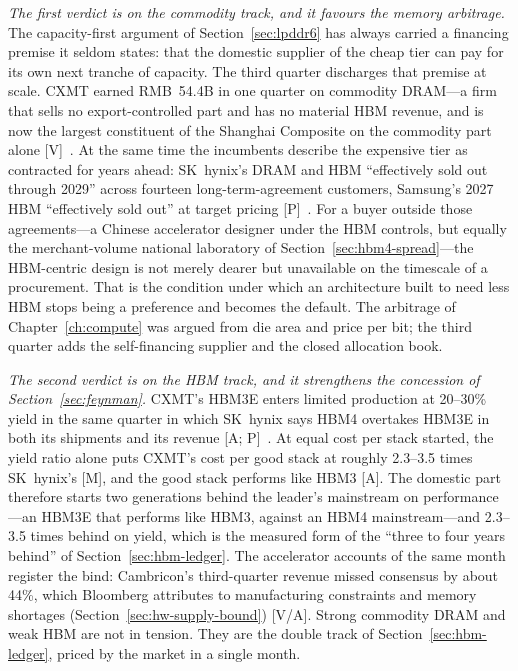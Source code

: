 \emph{The first verdict is on the commodity track, and it favours the memory arbitrage.} The capacity-first argument of Section~\ref{sec:lpddr6} has always carried a financing premise it seldom states: that the domestic supplier of the cheap tier can pay for its own next tranche of capacity. The third quarter discharges that premise at scale. CXMT earned RMB~54.4B in one quarter on commodity DRAM---a firm that sells no export-controlled part and has no material HBM revenue, and is now the largest constituent of the Shanghai Composite on the commodity part alone [V]~\cite{hw-cxmt-q3,hw-cxmt-index}. At the same time the incumbents describe the expensive tier as contracted for years ahead: SK~hynix's DRAM and HBM ``effectively sold out through 2029'' across fourteen long-term-agreement customers, Samsung's 2027 HBM ``effectively sold out'' at target pricing [P]~\cite{hw-skhynix-q3,hw-samsung-q3}. For a buyer outside those agreements---a Chinese accelerator designer under the HBM controls, but equally the merchant-volume national laboratory of Section~\ref{sec:hbm4-spread}---the HBM-centric design is not merely dearer but unavailable on the timescale of a procurement. That is the condition under which an architecture built to need less HBM stops being a preference and becomes the default. The arbitrage of Chapter~\ref{ch:compute} was argued from die area and price per bit; the third quarter adds the self-financing supplier and the closed allocation book.

\emph{The second verdict is on the HBM track, and it strengthens the concession of Section~\ref{sec:feynman}.} CXMT's HBM3E enters limited production at 20--30\% yield in the same quarter in which SK~hynix says HBM4 overtakes HBM3E in both its shipments and its revenue [A; P]~\cite{hw-cxmt-hbm3e,hw-skhynix-q3}. At equal cost per stack started, the yield ratio alone puts CXMT's cost per good stack at roughly 2.3--3.5 times SK~hynix's [M], and the good stack performs like HBM3 [A]. The domestic part therefore starts two generations behind the leader's mainstream on performance---an HBM3E that performs like HBM3, against an HBM4 mainstream---and 2.3--3.5 times behind on yield, which is the measured form of the ``three to four years behind'' of Section~\ref{sec:hbm-ledger}. The accelerator accounts of the same month register the bind: Cambricon's third-quarter revenue missed consensus by about 44\%, which Bloomberg attributes to manufacturing constraints and memory shortages (Section~\ref{sec:hw-supply-bound}) [V/A]. Strong commodity DRAM and weak HBM are not in tension. They are the double track of Section~\ref{sec:hbm-ledger}, priced by the market in a single month.

